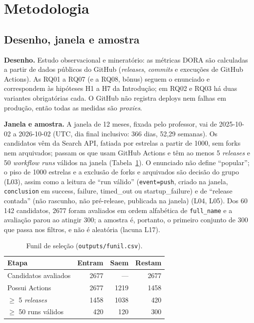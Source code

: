 \newcommand{\prov}[1]{\textbf{[PROVISÓRIO: #1]}}

\section{Metodologia}

\subsection{Desenho, janela e amostra}
\textbf{Desenho.} Estudo observacional e mineratório: as métricas DORA são calculadas a partir de dados
públicos do GitHub (\textit{releases}, \textit{commits} e execuções de GitHub Actions). As RQ01 a RQ07 (e a RQ08, bônus) seguem o
enunciado e correspondem às hipóteses H1 a H7 da Introdução; em RQ02 e RQ03 há duas variantes obrigatórias cada.
O GitHub não registra deploys nem falhas em
produção, então todas as medidas são \emph{proxies}.

\textbf{Janela e amostra.} A janela de 12 meses, fixada pelo professor, vai de 2025-10-02 a 2026-10-02 (UTC,
dia final inclusivo: 366 dias, 52,29 semanas). Os candidatos vêm da Search API, fatiada por estrelas a partir de
1000, sem forks nem arquivados; passam os que usam GitHub Actions e têm ao menos 5 \textit{releases} e 50
\textit{workflow runs} válidos na janela (Tabela~\ref{tab:funil}). O enunciado não define ``popular'';
o piso de 1000 estrelas e a exclusão de forks e arquivados são decisão do grupo (L03), assim como a leitura de
``run válido'' (\texttt{event=push}, criado na janela, \texttt{conclusion} em success, failure, timed\_out ou
startup\_failure) e de ``release contada'' (não rascunho, não pré-release, publicada na janela) (L04, L05).
Dos 60\,142 candidatos, 2677 foram avaliados em ordem alfabética de \texttt{full\_name} e a avaliação parou ao
atingir 300; a amostra é, portanto, o primeiro conjunto de 300 que passa nos filtros, e não é aleatória
(lacuna L17).

\begin{table}[ht]
\centering\small
\caption{Funil de seleção (\texttt{outputs/funil.csv}).}
\label{tab:funil}
\begin{tabular}{lrrr}
\hline
Etapa & Entram & Saem & Restam \\ \hline
Candidatos avaliados & 2677 & --- & 2677 \\
Possui Actions & 2677 & 1219 & 1458 \\
$\geq$ 5 \textit{releases} & 1458 & 1038 & 420 \\
$\geq$ 50 runs válidos & 420 & 120 & 300 \\ \hline
\end{tabular}
\end{table}

